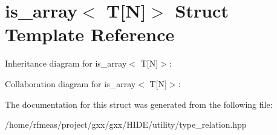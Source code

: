 \hypertarget{structis__array_3_01T[N]_4}{}\section{is\+\_\+array$<$ T\mbox{[}N\mbox{]}$>$ Struct Template Reference}
\label{structis__array_3_01T[N]_4}


Inheritance diagram for is\+\_\+array$<$ T\mbox{[}N\mbox{]}$>$\+:


Collaboration diagram for is\+\_\+array$<$ T\mbox{[}N\mbox{]}$>$\+:


The documentation for this struct was generated from the following file\+:\begin{DoxyCompactItemize}
\item 
/home/rfmeas/project/gxx/gxx/\+H\+I\+D\+E/utility/type\+\_\+relation.\+hpp\end{DoxyCompactItemize}
